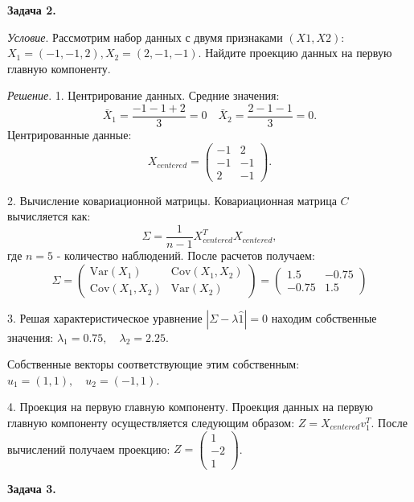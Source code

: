 \textbf{Задача 2.}

\textit{Условие}. Рассмотрим набор данных с двумя признаками $(X1, X2)$: $X_1 = (-1, -1, 2), X_2 = (2, -1, -1)$. Найдите проекцию данных на первую главную компоненту.

\textit{Решение}. 1. Центрирование данных. Средние значения: 
\begin{equation}
    \bar{X}_1 = \frac{-1 - 1 + 2}{3} = 0 \quad \bar{X}_2 = \frac{2 - 1 - 1}{3} = 0.
\end{equation}
Центрированные данные: 
\begin{equation}
    X_{centered} = \begin{pmatrix} -1 & 2 \\ -1 &  -1 \\ 2 & -1 \end{pmatrix}.
\end{equation}

2. Вычисление ковариационной матрицы. Ковариационная матрица $C$ вычисляется как:
\begin{equation}
    \Sigma = \frac{1}{n-1}X_{centered}^{T}X_{centered},
\end{equation}
где $n = 5$ - количество наблюдений.
После расчетов получаем:
\begin{equation}
    \Sigma = \begin{pmatrix} \text{Var}(X_1) & \text{Cov}(X_1, X_2) \\ \text{Cov}(X_1, X_2) & \text{Var}(X_2) \end{pmatrix} = \begin{pmatrix} 1.5 & -0.75 \\ -0.75 & 1.5 \end{pmatrix}
\end{equation}

3. Решая характеристическое уравнение $|\Sigma - \lambda \hat{1}| = 0$ находим собственные значения: $\lambda_1 = 0.75, \quad \lambda_2 = 2.25$.

Собственные векторы соответствующие этим собственным: $u_1 = (1, 1), \quad u_2 = (-1, 1)$.

4. Проекция на первую главную компоненту. Проекция данных на первую главную компоненту осуществляется следующим образом: $Z = X_{centered} v_1^T$. После вычислений получаем проекцию: $Z =\begin{pmatrix} 1 \\ -2 \\ 1 \end{pmatrix}$.

\textbf{Задача 3.}

